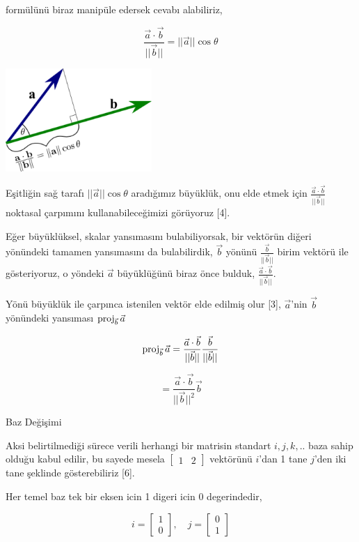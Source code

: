 \documentclass[12pt,fleqn]{article}\usepackage{../../common}
\begin{document}
formülünü biraz manipüle edersek cevabı alabiliriz, 

$$
\frac{\vec{a}\cdot\vec{b}}{||\vec{b}||} = ||\vec{a}|| \cos \theta
$$

\includegraphics[width=15em]{dot_product_projection.png}

Eşitliğin sağ tarafı $||\vec{a}|| \cos \theta$ aradığımız büyüklük, onu elde
etmek için $\frac{\vec{a}\cdot\vec{b}}{||\vec{b}||}$ noktasal çarpımını
kullanabileceğimizi görüyoruz [4].

Eğer büyüklüksel, skalar yansımasını bulabiliyorsak, bir vektörün diğeri
yönündeki tamamen yansımasını da bulabilirdik, $\vec{b}$ yönünü
$\frac{\vec{b}}{||\vec{b}||}$ birim vektörü ile gösteriyoruz, o yöndeki
$\vec{a}$ büyüklüğünü biraz önce bulduk,
$\frac{\vec{a}\cdot\vec{b}}{||\vec{b}||}$.

Yönü büyüklük ile çarpınca istenilen vektör elde edilmiş olur [3], $\vec{a}$'nin
$\vec{b}$ yönündeki yansıması $\operatorname{proj}_{\vec{b}} \vec{a}$

$$
\operatorname{proj}_{\vec{b}} \vec{a} = \frac{\vec{a}\cdot\vec{b}}{||\vec{b}||} \frac{\vec{b}}{||\vec{b}||}
$$

$$
= \frac{\vec{a}\cdot\vec{b}}{||\vec{b}||^2} \vec{b}
$$

Baz Değişimi

Aksi belirtilmediği sürece verili herhangi bir matrisin standart $i,j,k,..$ baza
sahip olduğu kabul edilir, bu sayede mesela $[\begin{array}{cc}1&2\end{array}]$
vektörünü $i$'dan 1 tane $j$'den iki tane şeklinde gösterebiliriz [6].

Her temel baz tek bir eksen icin 1 digeri icin 0 degerindedir,

$$
i = \left[\begin{array}{c}1 \\ 0 \end{array}\right], \quad
j = \left[\begin{array}{c}0 \\ 1 \end{array}\right]
$$
\end{document}
